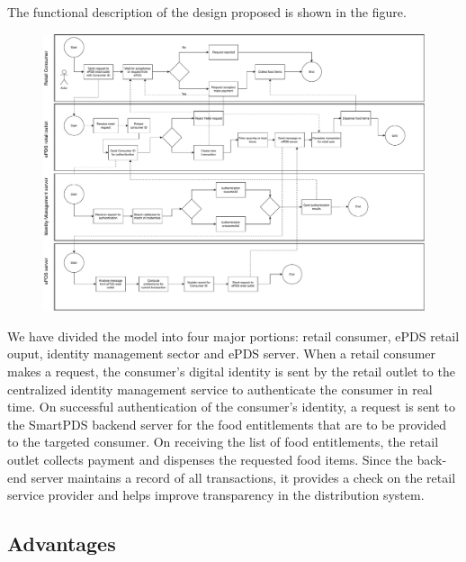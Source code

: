 \documentclass{article}
\begin{document}
The functional description of the design proposed is shown in the figure.

\begin{landscape}%
\begin{figure}[h]
\centering %
\includegraphics[width=20cm]{epds-functional-diagram}
\end{figure}
\end{landscape}

We have divided the model into four major portions: retail consumer, ePDS retail ouput, identity management sector and ePDS server. When a retail consumer makes a request, the consumer's digital identity is sent by the retail outlet to the centralized identity management service to authenticate the consumer in real time. On successful authentication of the consumer's identity, a request is sent to the SmartPDS backend server for the food entitlements that are to be provided to the targeted consumer. On receiving the list of food entitlements, the retail outlet collects payment and dispenses the requested food items. Since the back-end server maintains a record of all transactions, it provides a check on the retail service provider and helps improve transparency in the distribution system.


\subsection{Advantages}
\end{document}
